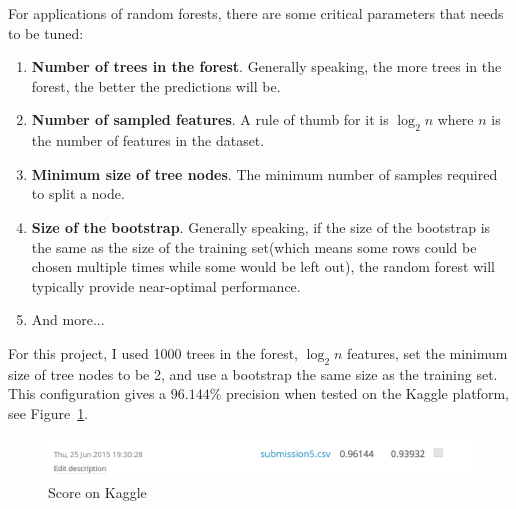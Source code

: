 \documentclass{article}
\begin{document}
For applications of random forests, there are some critical parameters that needs to be tuned:

\begin{enumerate}
	\item \textbf{Number of trees in the forest}. Generally speaking, the more trees in the forest, the better the predictions will be.
	\item \textbf{Number of sampled features}. A rule of thumb for it is $\log_2n$ where $n$ is the number of features in the dataset.
	\item \textbf{Minimum size of tree nodes}. The minimum number of samples required to split a node.
	\item \textbf{Size of the bootstrap}. Generally speaking, if the size of the bootstrap is the same as the size of the training set(which means some rows could be chosen multiple times while some would be left out), the random forest will typically provide near-optimal performance.
	\item And more...
\end{enumerate}

For this project, I used 1000 trees in the forest, $\log_2n$ features, set the minimum size of tree nodes to be 2, and use a bootstrap the same size as the training set. This configuration gives a $96.144\%$ precision when tested on the Kaggle platform, see Figure~\ref{fig:kaggle}.

\begin{figure}[]
	\centering
	\includegraphics[width=\linewidth]{kaggle.png}
	\caption{Score on Kaggle}
	\label{fig:kaggle}
\end{figure}
\end{document}
